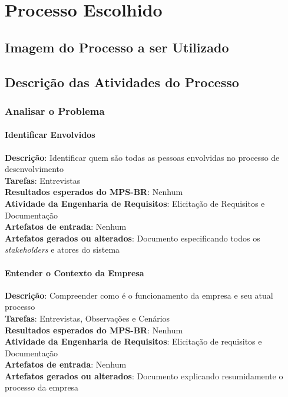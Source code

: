 \chapter{Processo Escolhido}
\label{chosen-process}

\section{Imagem do Processo a ser Utilizado}

\section{Descrição das Atividades do Processo}

\subsection{Analisar o Problema}

\subsubsection{Identificar Envolvidos}

\textbf{Descrição}: Identificar quem são todas as pessoas envolvidas no processo de desenvolvimento\\
\textbf{Tarefas}: Entrevistas\\
\textbf{Resultados esperados do MPS-BR}: Nenhum\\
\textbf{Atividade da Engenharia de Requisitos}: Elicitação de Requisitos e Documentação\\
\textbf{Artefatos de entrada}: Nenhum\\
\textbf{Artefatos gerados ou alterados}: Documento especificando todos os \textit{stakeholders} e atores do sistema

\subsubsection{Entender o Contexto da Empresa}

\textbf{Descrição}: Compreender como é o funcionamento da empresa e seu atual processo\\
\textbf{Tarefas}: Entrevistas, Observações e Cenários\\
\textbf{Resultados esperados do MPS-BR}: Nenhum\\
\textbf{Atividade da Engenharia de Requisitos}: Elicitação de requisitos e Documentação\\
\textbf{Artefatos de entrada}: Nenhum\\
\textbf{Artefatos gerados ou alterados}: Documento explicando resumidamente o processo da empresa

